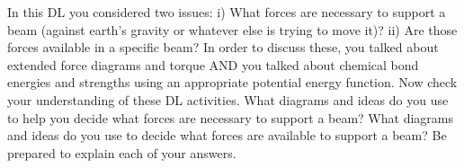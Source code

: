 \label{fnt7.3.4-1}

In this DL you considered two issues: 
i) 	What forces are necessary to support a beam (against earth's gravity or whatever else is trying to move it)? 
ii) 	Are those forces available in a specific beam?
 In order to discuss these, you talked about extended force diagrams and torque AND you talked about chemical bond energies and strengths using an appropriate potential energy function.   Now check your understanding of these DL activities.  What diagrams and ideas do you use to help you decide what forces are necessary to support a beam?  What diagrams and ideas do you use to decide what forces are available to support a beam?  Be prepared to explain each of your answers.
